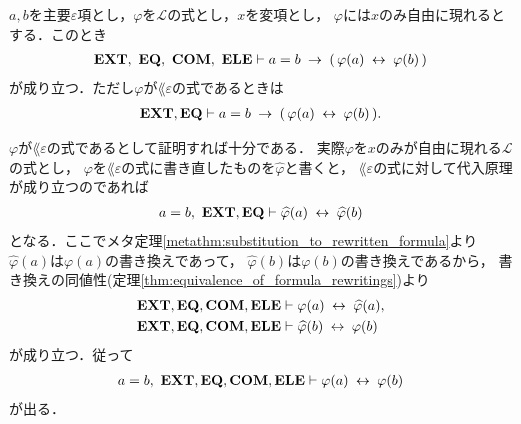 	
	
	\begin{screen}
		\begin{thm}[代入原理]\label{thm:the_principle_of_substitution}
			$a,b$を主要$\varepsilon$項とし，$\varphi$を$\mathcal{L}$の式とし，$x$を変項とし，
			$\varphi$には$x$のみ自由に現れるとする．このとき
			\begin{align}
				\mbox{{\bf EXT}},\ \mbox{{\bf EQ}},\ \mbox{\bf COM},\ \mbox{{\bf ELE}} \vdash a = b \hspace{0.25em}\rightarrow\hspace{0.25em} 
				(\, \varphi(a) \hspace{0.25em}\leftrightarrow\hspace{0.25em} \varphi(b)\, )
			\end{align}
			が成り立つ．ただし$\varphi$が$\lang{\varepsilon}$の式であるときは
			\begin{align}
				\mbox{{\bf EXT}},\mbox{{\bf EQ}} \vdash a = b \hspace{0.25em}\rightarrow\hspace{0.25em} 
				(\, \varphi(a) \hspace{0.25em}\leftrightarrow\hspace{0.25em} \varphi(b)\, ).
			\end{align}
		\end{thm}
	\end{screen}
	
	$\varphi$が$\lang{\varepsilon}$の式であるとして証明すれば十分である．
	実際$\varphi$を$x$のみが自由に現れる$\mathcal{L}$の式とし，
	$\varphi$を$\lang{\varepsilon}$の式に書き直したものを$\widehat{\varphi}$と書くと，
	$\lang{\varepsilon}$の式に対して代入原理が成り立つのであれば
	\begin{align}
		a = b,\ \mbox{{\bf EXT}},\mbox{{\bf EQ}} \vdash \widehat{\varphi}(a) \hspace{0.25em}\leftrightarrow\hspace{0.25em} \widehat{\varphi}(b)
	\end{align}
	となる．ここでメタ定理\ref{metathm:substitution_to_rewritten_formula}より
	$\widehat{\varphi}(a)$は$\varphi(a)$の書き換えであって，
	$\widehat{\varphi}(b)$は$\varphi(b)$の書き換えであるから，
	書き換えの同値性(定理\ref{thm:equivalence_of_formula_rewritings})より
	\begin{align}
		\mbox{{\bf EXT}},\mbox{{\bf EQ}},\mbox{\bf COM},\mbox{{\bf ELE}} &\vdash \varphi(a) \hspace{0.25em}\leftrightarrow\hspace{0.25em} \widehat{\varphi}(a), \\
		\mbox{{\bf EXT}},\mbox{{\bf EQ}},\mbox{\bf COM},\mbox{{\bf ELE}} &\vdash \widehat{\varphi}(b) \hspace{0.25em}\leftrightarrow\hspace{0.25em} \varphi(b)
	\end{align}
	が成り立つ．従って
	\begin{align}
		a = b,\ \mbox{{\bf EXT}},\mbox{{\bf EQ}},\mbox{\bf COM},\mbox{{\bf ELE}} \vdash \varphi(a) \hspace{0.25em}\leftrightarrow\hspace{0.25em} \varphi(b)
	\end{align}
	が出る．
	
